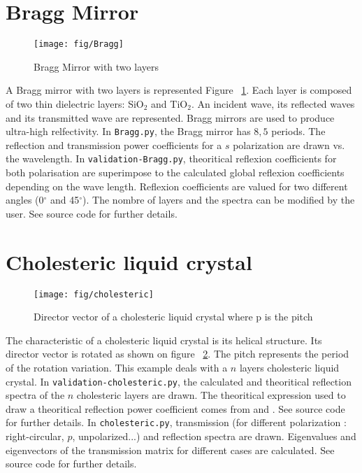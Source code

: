 \section{Bragg Mirror}
\begin{figure}[!h]
\texttt{[image: fig/Bragg]}
\caption{\label{fig:Bragg}Bragg Mirror with two layers}
\end{figure}
A Bragg mirror with two layers is represented Figure ~\ref{fig:Bragg}. Each layer is composed of two thin dielectric layers: SiO$_2$ and TiO$_2$. An incident wave, its reflected waves and its transmitted wave are represented. Bragg mirrors are used to produce ultra-high relfectivity. In \verb/Bragg.py/, the Bragg mirror has $8,5$ periods. The reflection and transmission power coefficients for a $s$ polarization are drawn vs. the wavelength. In \verb/validation-Bragg.py/, theoritical reflexion coefficients for both polarisation are superimpose to the calculated global reflexion coefficients depending on the wave length. Reflexion coefficients are valued for two different angles (0$^\circ$ and 45$^\circ$). The nombre of layers and the spectra can be modified by the user. See source code for further details.


\section{Cholesteric liquid crystal}
\begin{figure}[!h]
\begin{center}
\texttt{[image: fig/cholesteric]}
\end{center}
\caption{\label{fig:cholesteric}Director vector of a cholesteric liquid crystal where p is the pitch}
\end{figure}
The characteristic of a cholesteric liquid crystal is its helical structure. Its director vector is rotated as shown on figure ~\ref{fig:cholesteric}. The pitch represents the period of the rotation variation.
This example deals with a $n$ layers cholesteric liquid crystal. In \verb/validation-cholesteric.py/, the calculated and theoritical reflection spectra of the $n$ cholesteric layers are drawn. The theoritical expression used to draw a theoritical reflection power coefficient comes from \cite{Yang} and \cite{Chandrasekhar}. See source code for further details. In \verb/cholesteric.py/, transmission (for different polarization : right-circular, $p$, unpolarized...) and reflection spectra are drawn. Eigenvalues and eigenvectors of the transmission matrix for different cases are calculated. See source code for further details. 

